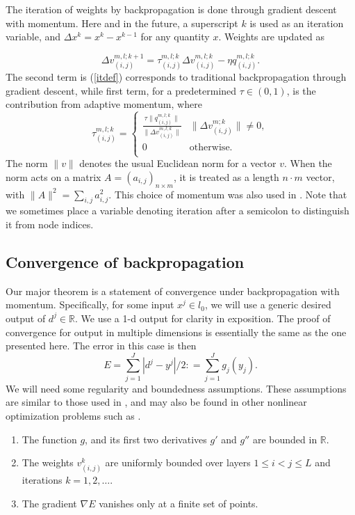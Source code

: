 \documentclass{jcmlatex}
\begin{document}
The iteration of weights by backpropagation is done through gradient descent with momentum. Here and in the future, a superscript $k$ is used as an iteration variable, and $\Delta x^k = x^k - x^{k-1}$ for any quantity $x$.   Weights are updated as

\begin{equation}\label{itdef}
\Delta v^{m,l;k+1}_{(i,j)}= \tau^{m,l;k}_{(i,j)}\Delta v^{m,l;k}_{(i,j)}
- \eta q^{m,l;k}_{(i,j)}.
\end{equation}
The second term is (\ref{itdef}) corresponds to traditional backpropagation through gradient descent, while first term, for a predetermined $\tau \in (0,1)$, is the contribution from adaptive momentum, where
\begin{equation}\label{taudef}
\tau^{m,l;k}_{(i,j)} = \begin{cases}\frac{\tau\|q^{m,l;k}_{(i,j)}\|}{\|\Delta
v^{m,l;k}_{(i,j)}\|} &  \|\Delta v^{m;k}_{(i,j)}\| \neq 0,\\
0  & \mathrm{otherwise}. \\
\end{cases}
\end{equation}
The norm $\|v\|$ denotes the usual Euclidean norm for a vector $v$. When the norm acts on a matrix $A = (a_{i,j})_{n\times m}$, it is treated as a
length $n\cdot m$ vector, with $\|A\|^2 = \sum_{i,j} a_{i,j}^2$. This choice of momentum was also used in \cite{zhang2006}. Note that  we sometimes place a variable denoting iteration after a semicolon to distinguish it from node indices.  

\subsection{Convergence of backpropagation}

Our major theorem is a statement of convergence under backpropagation with momentum.   Specifically, for some input $x^j \in l_0$, we will use a generic desired output of $d^j \in \mathbb{R}$. We use a 1-d output for clarity in exposition.  The proof of convergence for output in multiple dimensions is essentially the same as the one presented here. The error in this case is then
\begin{equation}
E = \sum_{j = 1}^J |d^j-y^j|/2: =  \sum_{j = 1}^J g_j(y_j). \label{edef}
\end{equation}We will need some regularity and boundedness assumptions.  These assumptions are similar to those used in \cite{wu2008convergence}, and may also be found in other nonlinear optimization problems such as \cite{gori1996}. 
\begin{ass} \label{assumes}
\hspace{0.5em}
\begin{enumerate} 
\item The function $g$, and its first two derivatives $g'$ and $g''$ are bounded in $\mathbb R$.
\item The weights $v_{(i,j)}^k$ are uniformly bounded over layers $1 \le i<j \le L$ and iterations $k = 1, 2, \dots.$
\item The gradient $\nabla E$ vanishes only at a finite set of points.
\end{enumerate}
\end{ass}
\end{document}

